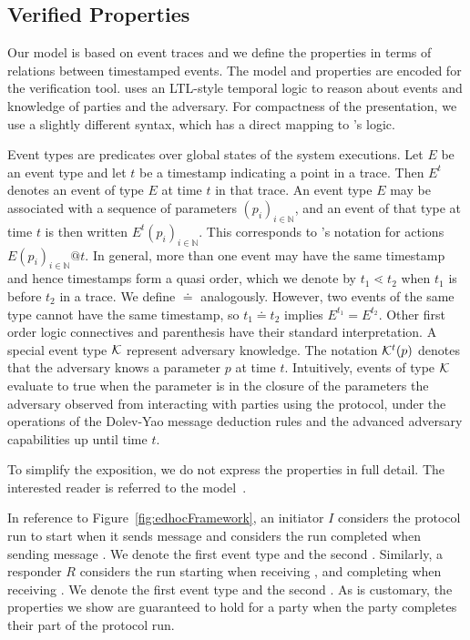 \subsection{Verified Properties}
\label{sec:desired-properties}
Our model is based on event traces and we define the
properties in terms of relations between timestamped events.
%
The model and properties are encoded for the \mTamarin{} verification tool.
%
\mTamarin{} uses an LTL-style temporal logic to reason about events and
knowledge of parties and the adversary.
%
For compactness of the presentation, we use a slightly different syntax, which
has a direct mapping to \mTamarin{}'s logic.
%

Event types are predicates over global states of the system executions.
%
Let $E$ be an event type and let $t$ be a timestamp indicating a point in a
trace.
%
Then $E^{t}$ denotes an event of type $E$ at time $t$ in that trace.
%
An event type $E$ may be associated with a sequence of parameters
$(p_i)_{i\in\mathbb{N}}$, and an event of that type at time $t$ is then
written $E^t(p_i)_{i\in\mathbb{N}}$.
%
This corresponds to \mTamarin{}'s notation for actions
$E(p_i)_{i\in\mathbb{N}}@t$.
%
In general, more than one event may have the same timestamp and hence
timestamps form a quasi order, which we denote by $t_1 \lessdot t_2$ when $t_1$
is before $t_2$ in a trace.
%
We define $\doteq$ analogously.
%
However, two events of the same type cannot have the same timestamp, so
$t_1 \doteq t_2$ implies $E^{t_1} = E^{t_2}$.
%
Other first order logic connectives and parenthesis have their standard
interpretation.
%
A special event type $\mathcal{K}$ represent adversary knowledge.
%
The notation $\mathcal{K}^t(p)$ denotes that the adversary knows a parameter $p$ at
time $t$.
%
Intuitively, events of type $\mathcal{K}$ evaluate to true when the parameter is in
the closure of the
parameters the adversary observed from interacting with parties using the
protocol, under the operations of the Dolev-Yao message deduction rules and
the advanced adversary capabilities up until time $t$.
%

To simplify the exposition, we do not express the properties in full detail.
%
The interested reader is referred to the \mTamarin{}
model~\cite{edhocTamarinRepo}.
%

In reference to Figure~\ref{fig:edhocFramework}, an initiator $I$ considers the
protocol run to start when it sends message \mMsgone{} and considers the run
completed when sending message \mMsgthree{}.
%
We denote the first event type \mIStart{} and the second \mIComplete{}.
%
Similarly, a responder $R$ considers the run starting when receiving
\mMsgone{}, and completing when receiving \mMsgthree{}.
%
We denote the first event type \mRStart{} and the second \mRComplete{}.
%
As is customary, the properties we show are guaranteed to hold for a party when
the party completes their part of the protocol run.\\
%

